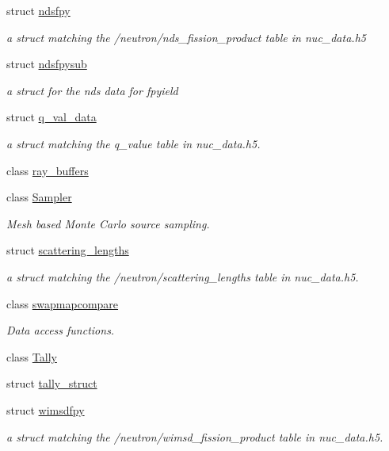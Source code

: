\begin{DoxyCompactItemize}
struct \hyperlink{structpyne_1_1ndsfpy}{ndsfpy}
\begin{DoxyCompactList}\small\item\em a struct matching the \textquotesingle{}/neutron/nds\+\_\+fission\+\_\+product\textquotesingle{} table in nuc\+\_\+data.\+h5 \end{DoxyCompactList}\item 
struct \hyperlink{structpyne_1_1ndsfpysub}{ndsfpysub}
\begin{DoxyCompactList}\small\item\em a struct for the nds data for fpyield \end{DoxyCompactList}\item 
struct \hyperlink{structpyne_1_1q__val__data}{q\+\_\+val\+\_\+data}
\begin{DoxyCompactList}\small\item\em a struct matching the q\+\_\+value table in nuc\+\_\+data.\+h5. \end{DoxyCompactList}\item 
class \hyperlink{classpyne_1_1ray__buffers}{ray\+\_\+buffers}
\item 
class \hyperlink{classpyne_1_1_sampler}{Sampler}
\begin{DoxyCompactList}\small\item\em Mesh based Monte Carlo source sampling. \end{DoxyCompactList}\item 
struct \hyperlink{structpyne_1_1scattering__lengths}{scattering\+\_\+lengths}
\begin{DoxyCompactList}\small\item\em a struct matching the \textquotesingle{}/neutron/scattering\+\_\+lengths\textquotesingle{} table in nuc\+\_\+data.\+h5. \end{DoxyCompactList}\item 
class \hyperlink{classpyne_1_1swapmapcompare}{swapmapcompare}
\begin{DoxyCompactList}\small\item\em Data access functions. \end{DoxyCompactList}\item 
class \hyperlink{classpyne_1_1_tally}{Tally}
\item 
struct \hyperlink{structpyne_1_1tally__struct}{tally\+\_\+struct}
\item 
struct \hyperlink{structpyne_1_1wimsdfpy}{wimsdfpy}
\begin{DoxyCompactList}\small\item\em a struct matching the \textquotesingle{}/neutron/wimsd\+\_\+fission\+\_\+product\textquotesingle{} table in nuc\+\_\+data.\+h5. \end{DoxyCompactList}\end{DoxyCompactItemize}
